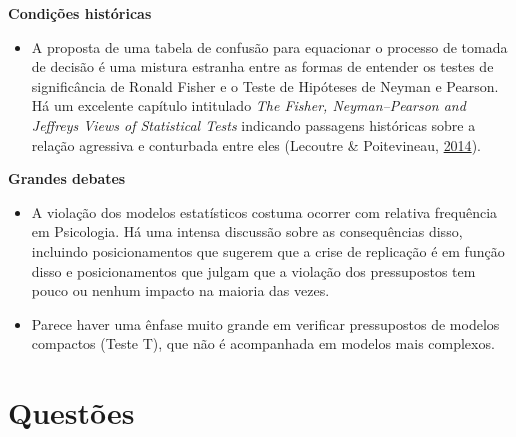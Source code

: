 \documentclass[
]{book}
\providecommand{\tightlist}{%
  \setlength{\itemsep}{0pt}\setlength{\parskip}{0pt}}
\begin{document}
\textbf{Condições históricas}

\begin{itemize}
\tightlist
\item
  A proposta de uma tabela de confusão para equacionar o processo de
  tomada de decisão é uma mistura estranha entre as formas de entender
  os testes de significância de Ronald Fisher e o Teste de Hipóteses de
  Neyman e Pearson. Há um excelente capítulo intitulado \emph{The
  Fisher, Neyman--Pearson and Jeffreys Views of Statistical Tests}
  indicando passagens históricas sobre a relação agressiva e conturbada
  entre eles (Lecoutre \& Poitevineau,
  \protect\hyperlink{ref-Lecoutre2014}{2014}).
\end{itemize}

\textbf{Grandes debates}

\begin{itemize}
\item
  A violação dos modelos estatísticos costuma ocorrer com relativa
  frequência em Psicologia. Há uma intensa discussão sobre as
  consequências disso, incluindo posicionamentos que sugerem que a crise
  de replicação é em função disso e posicionamentos que julgam que a
  violação dos pressupostos tem pouco ou nenhum impacto na maioria das
  vezes.
\item
  Parece haver uma ênfase muito grande em verificar pressupostos de
  modelos compactos (Teste T), que não é acompanhada em modelos mais
  complexos.
\end{itemize}

\hypertarget{questuxf5es-2}{%
\section{Questões}\label{questuxf5es-2}}
\end{document}
